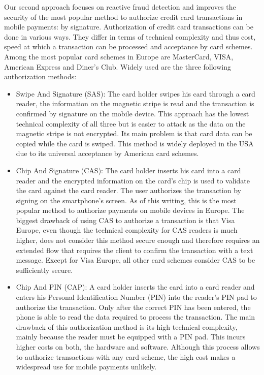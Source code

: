 \documentclass[a4paper, oneside]{csthesis}
\begin{document}
Our second approach focuses on reactive fraud detection and improves the security of the most popular method to authorize credit card transactions in mobile payments: by signature.
Authorization of credit card transactions can be done in various ways. They differ in terms of technical complexity and thus cost, speed at which a transaction can be processed and acceptance by card schemes. Among the most popular card schemes in Europe are MasterCard, VISA, American Express and Diner's Club. Widely used are the three following authorization methods:

\begin{itemize}
\item Swipe And Signature (SAS): The card holder swipes his card through a card reader, the information on the magnetic stripe is read and the transaction is confirmed by signature on the mobile device. This approach has the lowest technical complexity of all three but is easier to attack as the data on the magnetic stripe is not encrypted. Its main problem is that card data can be copied while the card is swiped. This method is widely deployed in the USA due to its universal acceptance by American card schemes.

\item Chip And Signature (CAS): The card holder inserts his card into a card reader and the encrypted information on the card's chip is used to validate the card against the card reader. The user authorizes the transaction by signing on the smartphone's screen. As of this writing, this is the most popular method to authorize payments on mobile devices in Europe. The biggest drawback of using CAS to authorize a transaction is that Visa Europe, even though the technical complexity for CAS readers is much higher, does not consider this method secure enough and therefore requires an extended flow that requires the client to confirm the transaction with a text message. Except for Visa Europe, all other card schemes consider CAS to be sufficiently secure.

\item Chip And PIN (CAP): A card holder inserts the card into a card reader and enters his Personal Identification Number (PIN) into the reader's PIN pad to authorize the transaction. Only after the correct PIN has been entered, the phone is able to read  the data required to process the transaction. The main drawback of this authorization method is its high technical complexity, mainly because the reader must be equipped with a PIN pad. This incurs higher costs on both, the hardware and software. Although this process allows to authorize transactions with any card scheme, the high cost makes a widespread use for mobile payments unlikely.
\end{itemize}
\end{document}
